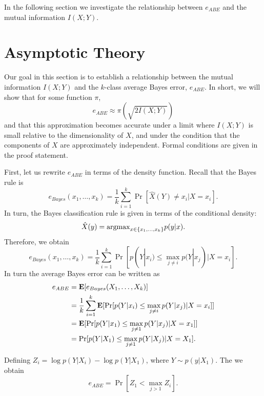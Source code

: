 \documentclass[12pt]{article}
\begin{document}
In the following section we investigate the relationship between $e_{ABE}$ and the mutual information $I(X; Y)$.

\section{Asymptotic Theory}

Our goal in this section is to establish a relationship between the mutual information $I(X; Y)$ and the $k$-class average Bayes error, $e_{ABE}$.
In short, we will show that for some function $\pi$,
\[
e_{ABE} \approx \pi(\sqrt{2 I(X; Y)})
\]
and that this approximation becomes accurate under a limit where $I(X; Y)$ is small relative to the dimensionality of $X$,
and under the condition that the components of $X$ are approximately independent.  Formal conditions are given in the proof statement.

First, let us rewrite $e_{ABE}$ in terms of the density function.  Recall that the Bayes rule is
\[
e_{Bayes}(x_1,\hdots, x_k) = \frac{1}{k}\sum_{i=1}^k \Pr[\hat{X}(Y) \neq x_i| X = x_i].
\]
In turn, the Bayes classification rule is given in terms of the conditional density:
\[
\hat{X}(y) = \text{argmax}_{x \in \{x_1,\hdots, x_k\}} p(y|x).
\]
Therefore, we obtain
\[
e_{Bayes}(x_1,\hdots, x_k) = \frac{1}{k}\sum_{i=1}^k \Pr[p(Y|x_i) \leq \max_{j \neq i} p(Y|x_j)| X = x_i].
\]
In turn the average Bayes error can be written as
\begin{align}
e_{ABE} &= \textbf{E}[e_{Bayes}(X_1,\hdots, X_k)]
\\&= \frac{1}{k}\sum_{i=1}^k \textbf{E}[\Pr[p(Y|x_i) \leq \max_{j \neq i} p(Y|x_j)| X = x_i]]
\\&= \textbf{E}[\Pr[p(Y|x_1) \leq \max_{j \neq 1} p(Y|x_j)| X = x_1]]
\\&= \Pr[p(Y|X_1) \leq \max_{j \neq 1} p(Y|X_j)| X = X_1].
\end{align}

Defining $Z_i = \log p(Y|X_i) - \log p(Y|X_1)$, where $Y \sim p(y|X_1)$.
The we obtain
\[
e_{ABE} = \Pr[Z_1 < \max_{j > 1} Z_i].
\]
\end{document}
